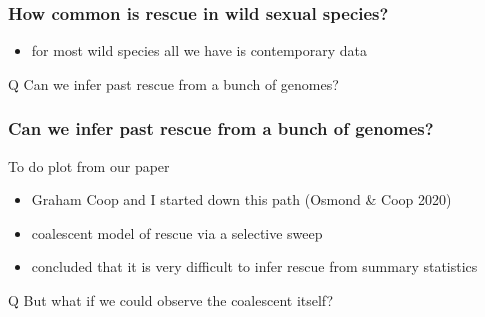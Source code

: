 \documentclass{beamer}
\begin{document}

\begin{frame}
	\frametitle{How common is rescue in wild sexual species?}

	\begin{itemize}
		\item for most wild species all we have is contemporary data \pause
	\end{itemize}
	
	\begin{block}{Q}
		Can we infer past rescue from a bunch of genomes?
	\end{block}
	
\end{frame}





\begin{frame}
	\frametitle{Can we infer past rescue from a bunch of genomes?}

	\begin{alertblock}{To do}
		plot from our paper
	\end{alertblock}
	
	\begin{itemize}
		\item Graham Coop and I started down this path (Osmond \& Coop 2020) \pause
		\item coalescent model of rescue via a selective sweep \pause
		\item concluded that it is very difficult to infer rescue from summary statistics \pause
	\end{itemize}
	
	\begin{block}{Q}
		But what if we could observe the coalescent itself?
	\end{block}	
	
\end{frame}


\end{document}

